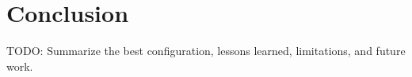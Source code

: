 \section{Conclusion}

TODO: Summarize the best configuration, lessons learned, limitations, and future work.
